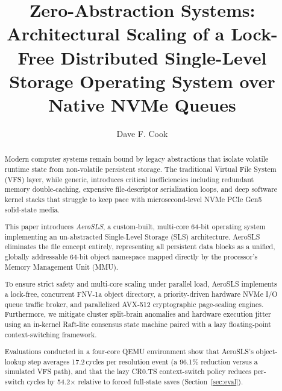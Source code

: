 \documentclass[sigconf]{acmart}
\begin{document}
\title{Zero-Abstraction Systems: Architectural Scaling of a
  Lock-Free Distributed Single-Level Storage Operating System
  over Native NVMe Queues}

\author{Dave F. Cook}

\begin{abstract}
Modern computer systems remain bound by legacy abstractions that
isolate volatile runtime state from non-volatile persistent
storage.  The traditional Virtual File System (VFS) layer, while
generic, introduces critical inefficiencies including redundant
memory double-caching, expensive file-descriptor serialization
loops, and deep software kernel stacks that struggle to keep pace
with microsecond-level NVMe PCIe Gen5 solid-state media.

This paper introduces \textit{AeroSLS}, a custom-built,
multi-core 64-bit operating system implementing an un-abstracted
Single-Level Storage (SLS) architecture.  AeroSLS eliminates the
file concept entirely, representing all persistent data blocks as
a unified, globally addressable 64-bit object namespace mapped
directly by the processor's Memory Management Unit (MMU).

To ensure strict safety and multi-core scaling under parallel
load, AeroSLS implements a lock-free, concurrent FNV-1a object
directory, a priority-driven hardware NVMe I/O queue traffic
broker, and parallelized AVX-512 cryptographic page-sealing
engines.  Furthermore, we mitigate cluster split-brain anomalies
and hardware execution jitter using an in-kernel Raft-lite
consensus state machine paired with a lazy floating-point
context-switching framework.

Evaluations conducted in a four-core QEMU environment show that
AeroSLS's object-lookup step averages 17.2\,cycles per resolution
event (a 96.1\% reduction versus a simulated VFS path), and that
the lazy CR0.TS context-switch policy reduces per-switch cycles
by 54.2$\times$ relative to forced full-state saves
(Section~\ref{sec:eval}).
\end{abstract}


\maketitle
\end{document}
